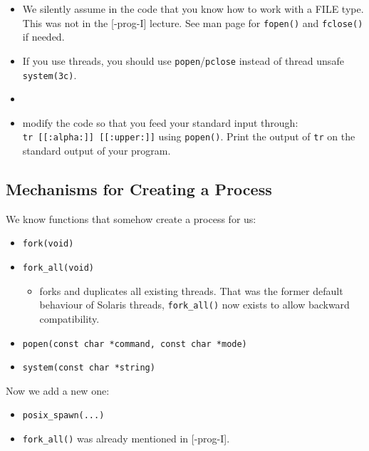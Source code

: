 \begin{itemize}
\item We silently assume in the code that you know how to work with a FILE type.
This was not in the [\myun\myix-prog-I] lecture. See man page for
\texttt{fopen()} and \texttt{fclose()} if needed.
\item If you use threads, you should use \texttt{popen}/\texttt{pclose} instead
of thread unsafe \texttt{system(3c)}.
\item {}
\item {} modify the code so that you feed your standard input
through:\\ \texttt{tr [[:alpha:]] [[:upper:]]} using \texttt{popen()}. Print the
output of \texttt{tr} on the standard output of your program.
\end{itemize}

\subsection{Mechanisms for Creating a Process}

We know functions that somehow create a process for us:

\begin{itemize}
\item \texttt{fork(void)}
\item \texttt{fork\_all(void)}
	\begin{itemize}
	\item forks and duplicates all existing threads. That was the former
	default behaviour of Solaris threads, \texttt{fork\_all()} now exists
	to allow backward compatibility.
	\end{itemize}
\item \texttt{popen(const char *command, const char *mode)}
\item \texttt{system(const char *string)}
\end{itemize}

Now we add a new one:
\begin{itemize}
\item \texttt{posix\_spawn(...)}
\end{itemize}

\begin{itemize}
\item \texttt{fork\_all()} was already mentioned in [\myun\myix-prog-I].
\end{itemize}

